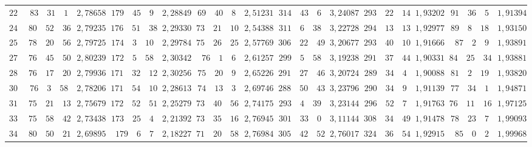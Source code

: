 \begin{landscape}
\begin{center}
\begin{tabular}{r|r|r|r|r|r|r|r|r|r|r|r|r}
\(225\) & \(83\quad 31\quad 1\) & \(2{,}78658\) & \(179\quad 45\quad 9\) & \(2{,}28849\) & \(69\quad 40\quad 8\) & \(2{,}51231\) & \(314\quad 43\quad 6\) & \(3{,}24087\) & \(293\quad 22\quad 14\) & \(1{,}93202\) & \(91\quad 36\quad 5\) & \(1{,}91394\) \\[3pt]
\(240\) & \(80\quad 52\quad 36\) & \(2{,}79235\) & \(176\quad 51\quad 38\) & \(2{,}29330\) & \(73\quad 21\quad 10\) & \(2{,}54388\) & \(311\quad 6\quad 38\) & \(3{,}22728\) & \(294\quad 13\quad 13\) & \(1{,}92977\) & \(89\quad 8\quad 18\) & \(1{,}93150\) \\
\(255\) & \(78\quad 20\quad 56\) & \(2{,}79725\) & \(174\quad 3\quad 10\) & \(2{,}29784\) & \(75\quad 26\quad 25\) & \(2{,}57769\) & \(306\quad 22\quad 49\) & \(3{,}20677\) & \(293\quad 40\quad 10\) & \(1{,}91666\) & \(87\quad 2\quad 9\) & \(1{,}93891\) \\
\(270\) & \(76\quad 45\quad 50\) & \(2{,}80239\) & \(172\quad 5\quad 58\) & \(2{,}30342\) & \(76\quad 1\quad 6\) & \(2{,}61257\) & \(299\quad 5\quad 58\) & \(3{,}19238\) & \(291\quad 37\quad 44\) & \(1{,}90331\) & \(84\quad 25\quad 34\) & \(1{,}93881\) \\
\(285\) & \(76\quad 17\quad 20\) & \(2{,}79936\) & \(171\quad 32\quad 12\) & \(2{,}30256\) & \(75\quad 20\quad 9\) & \(2{,}65226\) & \(291\quad 27\quad 46\) & \(3{,}20724\) & \(289\quad 34\quad 4\) & \(1{,}90088\) & \(81\quad 2\quad 19\) & \(1{,}93820\) \\[3pt]
\(300\) & \(76\quad 3\quad 58\) & \(2{,}78206\) & \(171\quad 54\quad 10\) & \(2{,}28613\) & \(74\quad 13\quad 3\) & \(2{,}69746\) & \(288\quad 50\quad 43\) & \(3{,}23796\) & \(290\quad 34\quad 9\) & \(1{,}91139\) & \(77\quad 34\quad 1\) & \(1{,}94871\) \\
\(315\) & \(75\quad 21\quad 13\) & \(2{,}75679\) & \(172\quad 52\quad 51\) & \(2{,}25279\) & \(73\quad 40\quad 56\) & \(2{,}74175\) & \(293\quad 4\quad 39\) & \(3{,}23144\) & \(296\quad 52\quad 7\) & \(1{,}91763\) & \(76\quad 11\quad 16\) & \(1{,}97125\) \\
\(330\) & \(75\quad 58\quad 42\) & \(2{,}73438\) & \(173\quad 25\quad 4\) & \(2{,}21392\) & \(73\quad 35\quad 16\) & \(2{,}76945\) & \(301\quad 33\quad 0\) & \(3{,}11144\) & \(308\quad 34\quad 49\) & \(1{,}91478\) & \(78\quad 23\quad 7\) & \(1{,}99093\) \\
\(345\) & \(80\quad 50\quad 21\) & \(2{,}69895\) & \(179\quad 6\quad 7\) & \(2{,}18227\) & \(71\quad 20\quad 58\) & \(2{,}76984\) & \(305\quad 42\quad 52\) & \(2{,}76017\) & \(324\quad 36\quad 54\) & \(1{,}92915\) & \(85\quad 0\quad 2\) & \(1{,}99968\) \\

\end{tabular}
\end{center}
\end{landscape}

